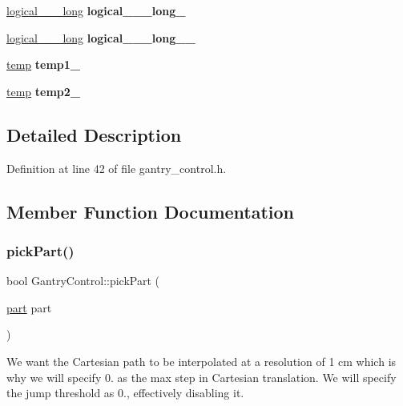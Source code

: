 \begin{DoxyCompactItemize}
\hyperlink{structPresetLocation}{logical\+\_\+\_\+\_\+long} {\bfseries logical\+\_\+\_\+\_\+long\+\_\+}
\item 
\mbox{\label{classGantryControl_a72932143626955070a9d07d8bc52d885}} 
\hyperlink{structPresetLocation}{logical\+\_\+\_\+\_\+long} {\bfseries logical\+\_\+\_\+\_\+long\+\_\+\_\+}
\item 
\mbox{\label{classGantryControl_a68ec6cefdcb0f459aa0abdc0ef7aa478}} 
\hyperlink{structPresetLocation}{temp} {\bfseries temp1\+\_\+}
\item 
\mbox{\label{classGantryControl_ad754e2c8f806f79eaae05fc92737deda}} 
\hyperlink{structPresetLocation}{temp} {\bfseries temp2\+\_\+}
\end{DoxyCompactItemize}


\subsection{Detailed Description}


Definition at line 42 of file gantry\+\_\+control.\+h.



\subsection{Member Function Documentation}
\mbox{\label{classGantryControl_af9280bbee71d1ceca8aef3d616d48254}} 
\subsubsection{\texorpdfstring{pick\+Part()}{pickPart()}}
{\footnotesize\ttfamily bool Gantry\+Control\+::pick\+Part (\begin{DoxyParamCaption}\item[{\hyperlink{structPart}{part}}]{part }\end{DoxyParamCaption})}

We want the Cartesian path to be interpolated at a resolution of 1 cm which is why we will specify 0. as the max step in Cartesian translation. We will specify the jump threshold as 0., effectively disabling it. 


